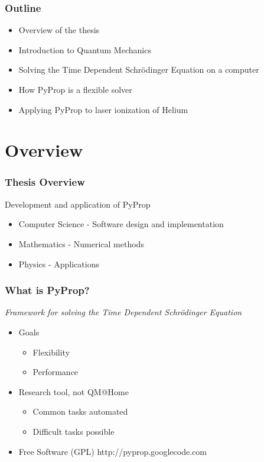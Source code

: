\documentclass{beamer}
\begin{document}
\begin{frame} %
	\frametitle{Outline}
	\begin{itemize}
		\item Overview of the thesis
		\item Introduction to Quantum Mechanics
		\item Solving the Time Dependent Schrödinger Equation on a computer
		\item How PyProp is a flexible solver 
		\item Applying PyProp to laser ionization of Helium
	\end{itemize}
\end{frame}


\section{Overview}

\begin{frame}
	\frametitle{Thesis Overview}

	Development and application of PyProp
	\begin{itemize}
		\item Computer Science - Software design and implementation
		\item Mathematics - Numerical methods
		\item Physics - Applications
	\end{itemize}
\end{frame}



\begin{frame}
	\frametitle{What is PyProp?}

	\textit{Framework for solving the Time Dependent Schrödinger Equation}

	\begin{itemize}
		\item<2-> Goals
			\begin{itemize}
				\item Flexibility
				\item Performance
			\end{itemize}
		\item<3-> Research tool, not QM@Home
			\begin{itemize}
				\item Common tasks automated
				\item Difficult tasks possible
			\end{itemize}
		\item<4-> Free Software (GPL) http://pyprop.googlecode.com
	\end{itemize}
\end{frame}
\end{document}
